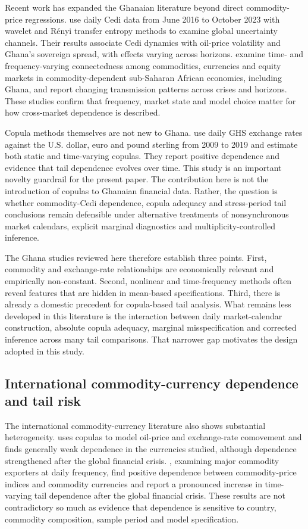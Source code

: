 Recent work has expanded the Ghanaian literature beyond direct commodity-price regressions. \citet{atipaga2025} use daily Cedi data from June 2016 to October 2023 with wavelet and Rényi transfer entropy methods to examine global uncertainty channels. Their results associate Cedi dynamics with oil-price volatility and Ghana's sovereign spread, with effects varying across horizons. \citet{woode2025} examine time- and frequency-varying connectedness among commodities, currencies and equity markets in commodity-dependent sub-Saharan African economies, including Ghana, and report changing transmission patterns across crises and horizons. These studies confirm that frequency, market state and model choice matter for how cross-market dependence is described.

Copula methods themselves are not new to Ghana. \citet{mensah2020} use daily GHS exchange rates against the U.S. dollar, euro and pound sterling from 2009 to 2019 and estimate both static and time-varying copulas. They report positive dependence and evidence that tail dependence evolves over time. This study is an important novelty guardrail for the present paper. The contribution here is not the introduction of copulas to Ghanaian financial data. Rather, the question is whether commodity-Cedi dependence, copula adequacy and stress-period tail conclusions remain defensible under alternative treatments of nonsynchronous market calendars, explicit marginal diagnostics and multiplicity-controlled inference.

The Ghana studies reviewed here therefore establish three points. First, commodity and exchange-rate relationships are economically relevant and empirically non-constant. Second, nonlinear and time-frequency methods often reveal features that are hidden in mean-based specifications. Third, there is already a domestic precedent for copula-based tail analysis. What remains less developed in this literature is the interaction between daily market-calendar construction, absolute copula adequacy, marginal misspecification and corrected inference across many tail comparisons. That narrower gap motivates the design adopted in this study.

\subsection{International commodity-currency dependence and tail risk}

The international commodity-currency literature also shows substantial heterogeneity. \citet{reboredo2012} uses copulas to model oil-price and exchange-rate comovement and finds generally weak dependence in the currencies studied, although dependence strengthened after the global financial crisis. \citet{ignatieva2017}, examining major commodity exporters at daily frequency, find positive dependence between commodity-price indices and commodity currencies and report a pronounced increase in time-varying tail dependence after the global financial crisis. These results are not contradictory so much as evidence that dependence is sensitive to country, commodity composition, sample period and model specification.

